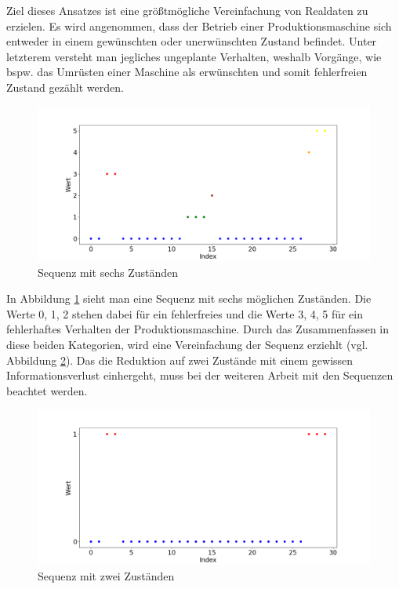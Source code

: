 Ziel dieses Ansatzes ist eine größtmögliche Vereinfachung von Realdaten zu erzielen. Es wird angenommen, dass der Betrieb einer Produktionsmaschine sich entweder in einem gewünschten oder unerwünschten Zustand befindet. Unter letzterem versteht man jegliches ungeplante Verhalten, weshalb Vorgänge, wie bspw. das Umrüsten einer Maschine als erwünschten und somit fehlerfreien Zustand gezählt werden. 

\begin{figure}[H]
	\centering
	\includegraphics[scale=0.32]{images/sequences/binary-sequences-full}
	\caption{Sequenz mit sechs Zuständen}
	\label{fig:binary-sequences-full}
\end{figure}

In Abbildung \ref{fig:binary-sequences-full} sieht man eine Sequenz mit sechs möglichen Zuständen. Die Werte 0, 1, 2 stehen dabei für ein fehlerfreies und die Werte 3, 4, 5 für ein fehlerhaftes Verhalten der Produktionsmaschine. Durch das Zusammenfassen in diese beiden Kategorien, wird eine Vereinfachung der Sequenz erziehlt (vgl. Abbildung \ref{fig:binary-sequences-reduced}). Das die Reduktion auf zwei Zustände mit einem gewissen Informationsverlust einhergeht, muss bei der weiteren Arbeit mit den Sequenzen beachtet werden.

\begin{figure}[H]
	\centering
		\includegraphics[scale=0.32]{images/sequences/binary-sequences-reduced}
	\caption{Sequenz mit zwei Zuständen}
	\label{fig:binary-sequences-reduced}
\end{figure}

